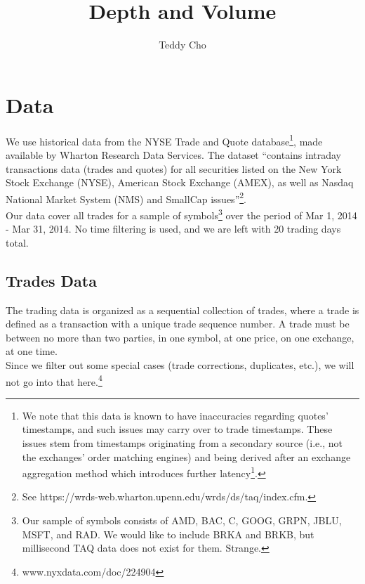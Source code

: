 \documentclass{article}
\begin{document}
\title{Depth and Volume} \author{Teddy Cho}

\maketitle
\vspace{.5pc}

\section{Data}
We use historical data from the NYSE Trade and Quote database\footnote{We note that this data is known to have inaccuracies regarding quotes' timestamps, and such issues may carry over to trade timestamps. These issues stem from timestamps originating from a secondary source (i.e., not the exchanges' order matching engines) and being derived after an exchange aggregation method which introduces further latency\footnote{See Budish, Cramton and Shim (2015) and Ding, Hanna and Hendershott (2014)}.}, made available by Wharton Research Data Services. The dataset ``contains intraday transactions data (trades and quotes) for all securities listed on the New York Stock Exchange (NYSE), American Stock Exchange (AMEX), as well as Nasdaq National Market System (NMS) and SmallCap issues''\footnote{See https://wrds-web.wharton.upenn.edu/wrds/ds/taq/index.cfm.}.\\

Our data cover all trades for a sample of symbols\footnote{Our sample of symbols consists of AMD, BAC, C, GOOG, GRPN, JBLU, MSFT, and RAD. We would like to include BRKA and BRKB, but millisecond TAQ data does not exist for them. Strange.} over the period of Mar 1, 2014 - Mar 31, 2014. No time filtering is used, and we are left with 20 trading days total.\\

\subsection{Trades Data}
The trading data is organized as a sequential collection of trades, where a trade is defined as a transaction with a unique trade sequence number. A trade must be between no more than two parties, in one symbol, at one price, on one exchange, at one time.\\
Since we filter out some special cases (trade corrections, duplicates, etc.), we will not go into that here.\footnote{www.nyxdata.com/doc/224904}\\
\end{document}
